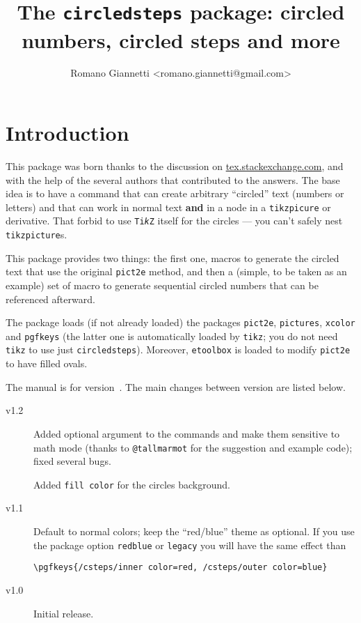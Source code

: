 \documentclass{ltxdoc}
\title{The \texttt{circledsteps} package: circled numbers, circled steps and more}
\author{Romano Giannetti <romano.giannetti@gmail.com>}
\begin{document}
\maketitle

\section{Introduction}

This package was born thanks to the discussion on \href{https://tex.stackexchange.com/questions/7032/good-way-to-make-textcircled-numbers}{tex.stackexchange.com}, and with the help of the several authors that contributed to the answers. The base idea is to have a command that can create arbitrary ``circled'' text (numbers or letters) and that can work in normal text \textbf{and} in a node in a \texttt{tikzpicure} or derivative. That forbid to use \texttt{Ti\emph{k}Z} itself for the circles --- you can't safely nest \texttt{tikzpicture}s.

This package provides two things: the first one, macros to generate the circled text that use the original \texttt{pict2e} method, and then a (simple, to be taken as an example) set of macro to generate sequential circled numbers that can be referenced afterward.

The package loads (if not already loaded) the packages \texttt{pict2e}, \texttt{pictures}, \texttt{xcolor} and \texttt{pgfkeys} (the latter one is automatically loaded by \texttt{tikz}; you do not need \texttt{tikz} to use just \texttt{circledsteps}). Moreover, \texttt{etoolbox} is loaded to modify \texttt{pict2e} to have filled ovals.

The manual is for version~\cstepsversion. The main changes between version are listed below.
\begin{description}
    \item[v1.2] Added optional argument to the commands and make them sensitive to math mode (thanks to \texttt{@tallmarmot} for the suggestion and example code); fixed several bugs.

        Added \texttt{fill color} for the circles background.
    \item[v1.1] Default to normal colors; keep the ``red/blue'' theme as optional.
        If you use the package option \texttt{redblue} or \texttt{legacy} you will have the same effect than
        \begin{lstlisting}[]
    \pgfkeys{/csteps/inner color=red, /csteps/outer color=blue}
        \end{lstlisting}
    \item[v1.0] Initial release.
\end{description}
\end{document}
